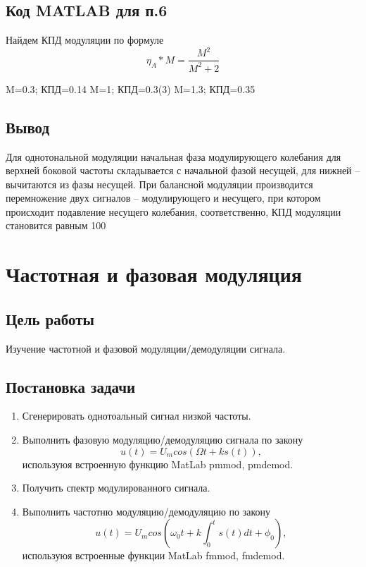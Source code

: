 \documentclass[10pt,a4paper]{article}
\begin{document}
\FloatBarrier
\subsection{Код MATLAB для п.6}
Найдем КПД модуляции по формуле
\begin{displaymath}
\eta_{A}*M=\frac{M^{2}}{M^{2}+2}
\end{displaymath}
\begin{center}
M=0.3; КПД=0.14\newline
M=1; КПД=0.3(3)\newline
M=1.3; КПД=0.35\newline
\end{center}
\subsection{Вывод}
Для однотональной модуляции начальная фаза модулирующего колебания для верхней боковой частоты складывается с начальной фазой несущей, для нижней – вычитаются из фазы несущей.
При балансной модуляции производится перемножение двух сигналов – модулирующего и несущего, при котором происходит подавление несущего колебания, соответственно, КПД модуляции становится равным 100%
\section{Частотная и фазовая модуляция}

\subsection{Цель работы}
Изучение частотной и фазовой модуляции/демодуляции сигнала.

\subsection{Постановка задачи}
	\begin{enumerate}
		\item Сгенерировать однотоальный сигнал низкой частоты.
		\item Выполнить фазовую модуляцию/демодуляцию сигнала по закону
				\begin{equation}
					u(t) = U_m cos(\Omega t + ks(t)),
				\end{equation}
		используюя встроенную функцию MatLab pmmod, pmdemod.
		\item Получить спектр модулированного сигнала.
		\item Выполнить частотню модуляцию/демодуляцию по закону
				\begin{equation}
					u(t) = U_m cos(\omega_0 t + k \int_0^t s(t) dt + \phi_0),
				\end{equation}
		используюя встроенные функции MatLab fmmod, fmdemod.
	\end{enumerate}
\end{document}
